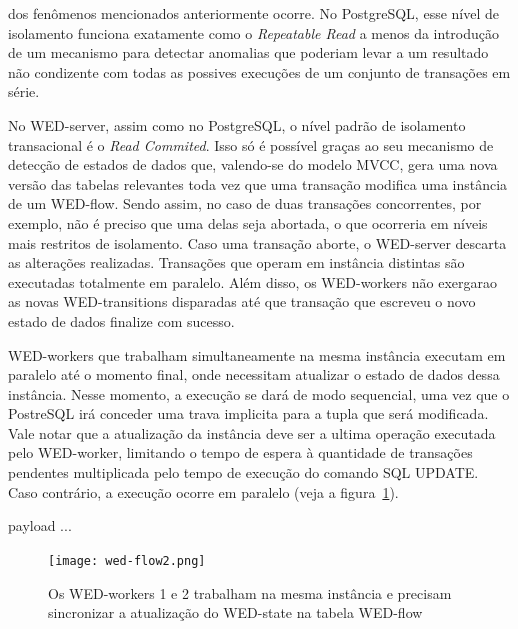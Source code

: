 \documentclass[conference]{IEEEtran}
\begin{document}
dos fenômenos mencionados anteriormente ocorre. No PostgreSQL, esse nível de isolamento funciona exatamente como o \emph{Repeatable Read}
a menos da introdução de um mecanismo para detectar anomalias que poderiam levar a um resultado não condizente com todas
as possives execuções de um conjunto de transações em série.
\par No WED-server, assim como no PostgreSQL, o nível padrão de isolamento transacional é o \emph{Read Commited}. Isso só
é possível graças ao seu mecanismo de detecção de estados de dados que, valendo-se do modelo MVCC, gera uma nova versão das
tabelas relevantes toda vez que uma transação modifica uma instância de um WED-flow. Sendo assim, no caso de duas transações 
concorrentes, por exemplo, não é preciso que uma delas seja abortada, o que ocorreria em níveis mais restritos de isolamento.
Caso uma transação aborte, o WED-server descarta as alterações realizadas. Transações que operam em instância distintas 
são executadas totalmente em paralelo. Além disso, os WED-workers não exergarao as novas WED-transitions 
disparadas até que transação que escreveu o novo estado de dados finalize com sucesso.
\par WED-workers que trabalham simultaneamente na mesma instância executam em paralelo até o momento final, onde necessitam
atualizar o estado de dados dessa instância. Nesse momento, a execução se dará de modo sequencial, uma vez que o PostreSQL
irá conceder uma trava implicita para a tupla que será modificada. Vale notar que a atualização da instância deve ser a 
ultima operação executada pelo WED-worker, limitando o tempo de espera à quantidade de transações pendentes multiplicada 
pelo tempo de execução do comando SQL UPDATE. Caso contrário, a execução ocorre em paralelo (veja a figura~\ref{fig_wf}).
\par payload ...
   
\begin{figure}[!t]
\centering
\texttt{[image: wed-flow2.png]}
\caption{Os WED-workers 1 e 2 trabalham na mesma instância e precisam sincronizar a atualização do WED-state na tabela
WED-flow}
\label{fig_wf}
\end{figure}

\end{document}
